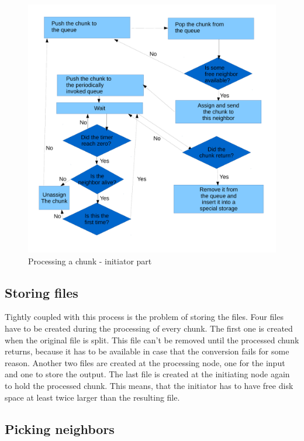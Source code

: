 \begin{figure}[h]
\begin{center}
\includegraphics[scale=0.40]{./img/workflow_chunks.pdf}
\caption{Processing a chunk - initiator part}
\end{center}
\end{figure}

\subsection*{Storing files}

Tightly coupled with this process is the problem of storing the files.
Four files have to be created during the processing of every chunk. The
first one is created when the original file is split. This file can't be
removed until the processed chunk returns, because it has to be
available in case that the conversion fails for some reason. Another two
files are created at the processing node, one for the input and one to
store the output. The last file is created at the initiating node again
to hold the processed chunk. This means, that the initiator has to have
free disk space at least twice larger than the resulting file.

\subsection*{Picking neighbors}

